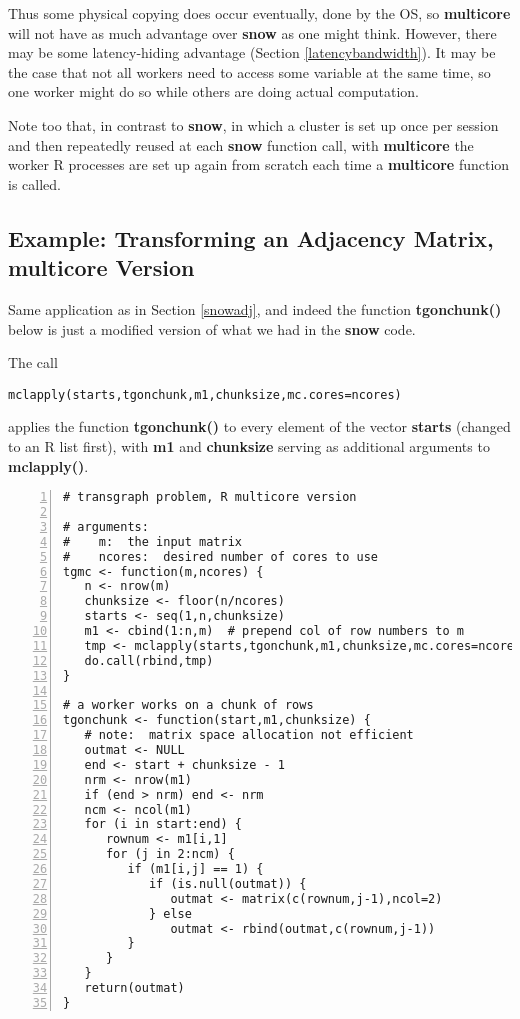 Thus some physical copying does occur eventually, done by the OS, so
{\bf multicore} will not have as much advantage over {\bf snow} as one
might think.  However, there may be some latency-hiding advantage
(Section \ref{latencybandwidth}).  It may be the case that not all
workers need to access some variable at the same time, so one worker
might do so while others are doing actual computation.

Note too that, in contrast to {\bf snow}, in which a cluster is set up
once per session and then repeatedly reused at each {\bf snow} function
call, with {\bf multicore} the worker R processes are set up again from
scratch each time a {\bf multicore} function is called.

\subsection{Example:  Transforming an Adjacency Matrix, multicore
Version}

Same application as in Section \ref{snowadj}, and indeed the function
{\bf tgonchunk()} below is just a modified version of what we had in the
{\bf snow} code.

The call

\begin{lstlisting}
mclapply(starts,tgonchunk,m1,chunksize,mc.cores=ncores)
\end{lstlisting}

applies the function {\bf tgonchunk()} to every element of the vector
{\bf starts} (changed to an R list first), with {\bf m1} and {\bf
chunksize} serving as additional arguments to {\bf mclapply()}.

\begin{lstlisting}[numbers=left]
# transgraph problem, R multicore version

# arguments:
#    m:  the input matrix
#    ncores:  desired number of cores to use
tgmc <- function(m,ncores) {
   n <- nrow(m)
   chunksize <- floor(n/ncores)
   starts <- seq(1,n,chunksize)
   m1 <- cbind(1:n,m)  # prepend col of row numbers to m
   tmp <- mclapply(starts,tgonchunk,m1,chunksize,mc.cores=ncores)
   do.call(rbind,tmp)
}

# a worker works on a chunk of rows
tgonchunk <- function(start,m1,chunksize) {
   # note:  matrix space allocation not efficient
   outmat <- NULL
   end <- start + chunksize - 1
   nrm <- nrow(m1)
   if (end > nrm) end <- nrm
   ncm <- ncol(m1)
   for (i in start:end) {
      rownum <- m1[i,1]
      for (j in 2:ncm) {
         if (m1[i,j] == 1) {
            if (is.null(outmat)) {
               outmat <- matrix(c(rownum,j-1),ncol=2)
            } else
               outmat <- rbind(outmat,c(rownum,j-1))
         }
      }
   }
   return(outmat)
}
\end{lstlisting}

